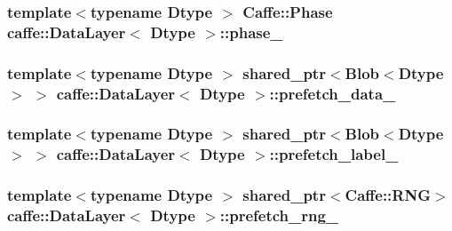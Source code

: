 \hypertarget{classcaffe_1_1_data_layer_adf7d23050e73666ed3305715624599c2}{
\subsubsection[{phase\+\_\+}]{\setlength{\rightskip}{0pt plus 5cm}template$<$typename Dtype $>$ {\bf Caffe\+::\+Phase} {\bf caffe\+::\+Data\+Layer}$<$ Dtype $>$\+::phase\+\_\+\hspace{0.3cm}{\ttfamily [protected]}}}\label{classcaffe_1_1_data_layer_adf7d23050e73666ed3305715624599c2}
\hypertarget{classcaffe_1_1_data_layer_a6c61442271fe47f944c2b07a794b4245}{
\subsubsection[{prefetch\+\_\+data\+\_\+}]{\setlength{\rightskip}{0pt plus 5cm}template$<$typename Dtype $>$ shared\+\_\+ptr$<${\bf Blob}$<$Dtype$>$ $>$ {\bf caffe\+::\+Data\+Layer}$<$ Dtype $>$\+::prefetch\+\_\+data\+\_\+\hspace{0.3cm}{\ttfamily [protected]}}}\label{classcaffe_1_1_data_layer_a6c61442271fe47f944c2b07a794b4245}
\hypertarget{classcaffe_1_1_data_layer_a3bd700fc3b186d60ce90329a57923830}{
\subsubsection[{prefetch\+\_\+label\+\_\+}]{\setlength{\rightskip}{0pt plus 5cm}template$<$typename Dtype $>$ shared\+\_\+ptr$<${\bf Blob}$<$Dtype$>$ $>$ {\bf caffe\+::\+Data\+Layer}$<$ Dtype $>$\+::prefetch\+\_\+label\+\_\+\hspace{0.3cm}{\ttfamily [protected]}}}\label{classcaffe_1_1_data_layer_a3bd700fc3b186d60ce90329a57923830}
\hypertarget{classcaffe_1_1_data_layer_a1ec4389cc48a637748446900ccab7767}{
\subsubsection[{prefetch\+\_\+rng\+\_\+}]{\setlength{\rightskip}{0pt plus 5cm}template$<$typename Dtype $>$ shared\+\_\+ptr$<${\bf Caffe\+::\+R\+N\+G}$>$ {\bf caffe\+::\+Data\+Layer}$<$ Dtype $>$\+::prefetch\+\_\+rng\+\_\+\hspace{0.3cm}{\ttfamily [protected]}}}\label{classcaffe_1_1_data_layer_a1ec4389cc48a637748446900ccab7767}
